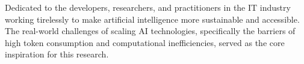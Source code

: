 Dedicated to the developers, researchers, and practitioners in the IT industry working tirelessly to make artificial intelligence more sustainable and accessible. The real-world challenges of scaling AI technologies, specifically the barriers of high token consumption and computational inefficiencies, served as the core inspiration for this research.